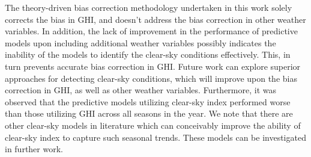 \par The theory-driven bias correction methodology undertaken in this work solely corrects the bias in GHI, and doesn't address the bias correction in other weather variables. In addition, the lack of improvement in the performance of predictive models upon including additional weather variables possibly indicates the inability of the models to identify the clear-sky conditions effectively. This, in turn prevents accurate bias correction in GHI. Future work can explore superior approaches for detecting clear-sky conditions, which will improve upon the bias correction in GHI, as well as other weather variables. Furthermore, it was observed that the predictive models utilizing clear-sky index performed worse than those utilizing GHI across all seasons in the year. We note that there are other clear-sky models in literature which can conceivably improve the ability of clear-sky index to capture such seasonal trends. These models can be investigated in further work.

\newpage